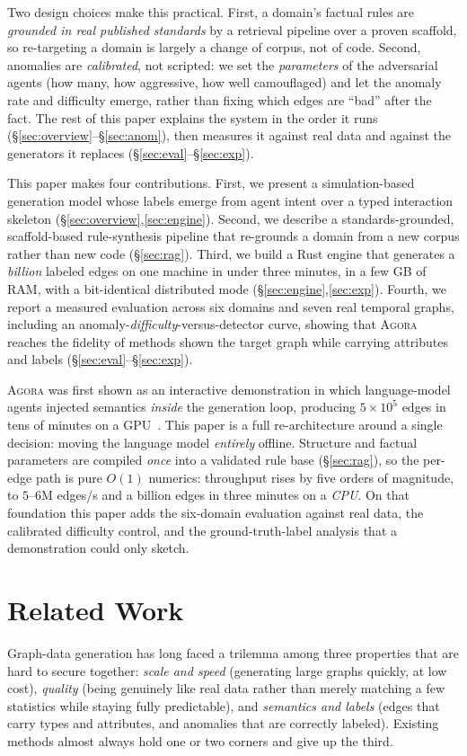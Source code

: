 \documentclass[sigconf,review,anonymous]{acmart}
\newcommand{\sys}{\textsc{Agora}\xspace}
\begin{document}
Two design choices make this practical. First, a domain's factual rules
are \emph{grounded in real published standards} by a retrieval pipeline over a proven
scaffold, so re-targeting a domain is largely a change of corpus, not of code. Second,
anomalies are \emph{calibrated}, not scripted: we set the \emph{parameters} of the
adversarial agents (how many, how aggressive, how well camouflaged) and let the
anomaly rate and difficulty emerge, rather than fixing which edges are ``bad''
after the fact. The rest of this paper explains the system in the order it runs
(\S\ref{sec:overview}--\S\ref{sec:anom}), then measures it against real data and
against the generators it replaces (\S\ref{sec:eval}--\S\ref{sec:exp}).

This paper makes four contributions. First, we present a simulation-based generation
model whose labels emerge from agent intent over a typed interaction skeleton
(\S\ref{sec:overview},\ref{sec:engine}). Second, we describe a standards-grounded,
scaffold-based rule-synthesis pipeline that re-grounds a domain from a new corpus
rather than new code (\S\ref{sec:rag}). Third, we build a Rust engine that generates a
\emph{billion} labeled edges on one machine in under three minutes, in a few GB of RAM,
with a bit-identical distributed mode (\S\ref{sec:engine},\ref{sec:exp}). Fourth, we
report a measured evaluation across six domains and seven real temporal graphs,
including an anomaly-\emph{difficulty}-versus-detector curve, showing that \sys{}
reaches the fidelity of methods shown the target graph while carrying attributes and
labels (\S\ref{sec:eval}--\S\ref{sec:exp}).

\sys{} was first shown as an interactive demonstration in which language-model agents
injected semantics \emph{inside} the generation loop, producing $5\!\times\!10^5$
edges in tens of minutes on a GPU~\cite{sagademo2026}. This paper is a full
re-architecture around a single decision: moving the language model \emph{entirely}
offline. Structure and factual parameters are compiled \emph{once} into a validated
rule base (\S\ref{sec:rag}), so the per-edge path is pure $O(1)$ numerics: throughput
rises by five orders of magnitude, to $5$--$6$M edges/s and a billion edges in three
minutes on a \emph{CPU}. On that foundation this paper adds the six-domain evaluation
against real data, the calibrated difficulty control, and the ground-truth-label
analysis that a demonstration could only sketch.

\section{Related Work}
\label{sec:related}
Graph-data generation has long faced a trilemma among three properties that are hard
to secure together: \emph{scale and speed} (generating large graphs quickly, at low
cost), \emph{quality} (being genuinely like real data rather than merely matching a few
statistics while staying fully predictable), and \emph{semantics and labels} (edges
that carry types and attributes, and anomalies that are correctly labeled). Existing
methods almost always hold one or two corners and give up the third.
\end{document}
